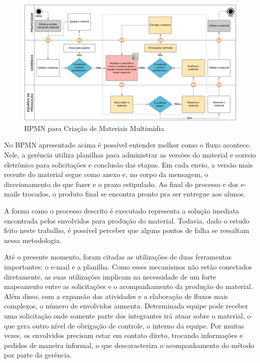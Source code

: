 \begin{figure}[H]
\centering
     \includegraphics[width=1.0\textwidth]{Images/bpmn1.png}
      \caption{BPMN para Criação de Materiais Multimídia}
       \label{fig:bpmn1}
\end{figure}

No BPMN apresentado acima é possível entender melhor como o fluxo acontece. Nele, a gerência utiliza planilhas para administrar as versões do material e correio eletrônico para solicitações e conclusão das etapas. Em cada envio, a versão mais recente do material segue como anexo e, no corpo da mensagem, o direcionamento do que fazer e o prazo estipulado. Ao final do processo e dos e-mails trocados, o produto final se encontra pronto pra ser entregue aos alunos.

A forma como o processo descrito é executado representa a solução imediata encontrada pelos envolvidos para produção do material. Todavia, dado o estudo feito neste trabalho, é possível perceber que alguns pontos de falha se ressaltam nessa metodologia. 

Até o presente momento, foram citadas as utilizações de duas ferramentas importantes: o e-mail e a planilha. Como esses mecanismos não estão conectados diretamente, as suas utilizações implicam na necessidade de um forte mapeamento entre as solicitações e o acompanhamento da produção do material. Além disso, com a expansão das atividades e a elaboração de fluxos mais complexos, o número de envolvidos aumenta. Determinada equipe pode receber uma solicitação onde somente parte dos integrantes irá atuar sobre o material, o que gera outro nível de obrigação de controle, o interno da equipe. Por muitas vezes, os envolvidos precisam estar em contato direto, trocando informações e pedidos de maneira informal, o que descaracteriza o acompanhamento do método por parte da gerência. 

